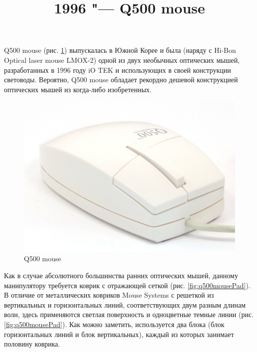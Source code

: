 \documentclass[11pt, a4paper]{article}
\begin{document}
\title{1996 "--- Q500 mouse}
\date{}
\maketitle
{}
    Q500 mouse (рис. \ref{fig:q500mousePic}) выпускалась в Южной Корее и была (наряду с Hi-Bon Optical laser mouse LMOX-2) одной из двух необычных оптических мышей, разработанных в 1996 году iO TEK и использующих в своей конструкции световоды. Вероятно, Q500 mouse обладает рекордно дешевой конструкцией оптических мышей из когда-либо изобретенных.

\begin{figure}[h]
    \centering
    \includegraphics[scale=0.5]{1996_q500_mouse/pic_30.jpg}
    \caption{Q500 mouse}
    \label{fig:q500mousePic}
\end{figure}

Как в случае абсолютного большинства ранних оптических мышей, данному манипулятору требуется коврик с отражающей сеткой (рис. \ref{fig:q500mousePad}). В отличие от металлических ковриков Mouse Systems с решеткой из вертикальных и горизонтальных линий, соответствующих двум разным длинам волн, здесь применяются светлая поверхность и одноцветные темные линии (рис. \ref{fig:q500mousePad}). Как можно заметить, используется два блока (блок горизонтальных линий и блок вертикальных), каждый из которых занимает половину коврика.
\end{document}
